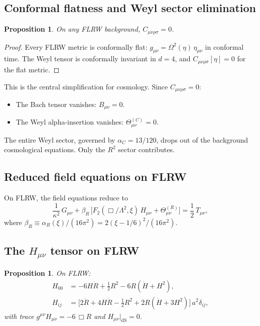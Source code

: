 \documentclass[12pt,a4paper]{article}
\newcommand{\Lam}{\Lambda}
\theoremstyle{plain}
\newtheorem{proposition}[theorem]{Proposition}
\theoremstyle{definition}
\begin{document}
\subsection{Conformal flatness and Weyl sector elimination}

\begin{proposition}
\label{prop:weyl-flrw}
On any FLRW background, $C_{\mu\nu\rho\sigma} = 0$.
\end{proposition}

\begin{proof}
Every FLRW metric is conformally flat:
$g_{\mu\nu} = \Omega^2(\eta)\,\eta_{\mu\nu}$ in conformal time.  The Weyl
tensor is conformally invariant in $d = 4$, and
$C_{\mu\nu\rho\sigma}[\eta] = 0$ for the flat metric.
\end{proof}

This is the central simplification for cosmology.  Since
$C_{\mu\nu\rho\sigma} = 0$:
\begin{itemize}[nosep]
  \item The Bach tensor vanishes: $B_{\mu\nu} = 0$.
  \item The Weyl alpha-insertion vanishes: $\Theta^{(C)}_{\mu\nu} = 0$.
\end{itemize}
The entire Weyl sector, governed by $\alpha_C = 13/120$, drops out of the
background cosmological equations.  Only the $R^2$ sector contributes.

\subsection{Reduced field equations on FLRW}

On FLRW, the field equations reduce to
\begin{equation}\label{eq:reduced-eom}
  \frac{1}{\kappa^2}\,G_{\mu\nu}
  + \beta_R\,
  \bigl[F_2(\Box/\Lam^2,\xi)\,H_{\mu\nu}
    + \Theta^{(R)}_{\mu\nu}\bigr]
  = \frac{1}{2}\,T_{\mu\nu},
\end{equation}
where $\beta_R \equiv \alpha_R(\xi)/(16\pi^2)
= 2(\xi - 1/6)^2/(16\pi^2)$.

\subsection{The \texorpdfstring{$H_{\mu\nu}$}{Hmunu} tensor on FLRW}

\begin{proposition}
\label{prop:H-FLRW}
On FLRW:
\begin{align}
  H_{00} &= -6H\dot{R} + \tfrac{1}{2}R^2
  - 6R(\dot{H} + H^2), \label{eq:H00-FLRW}\\
  H_{ij} &= \bigl[2\ddot{R} + 4H\dot{R}
  - \tfrac{1}{2}R^2
  + 2R(\dot{H} + 3H^2)\bigr]\,a^2\delta_{ij},
  \label{eq:Hij-FLRW}
\end{align}
with trace $g^{\mu\nu}H_{\mu\nu} = -6\,\Box R$ and
$H_{\mu\nu}|_{\mathrm{dS}} = 0$.
\end{proposition}
\end{document}
